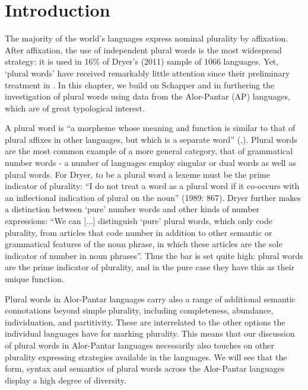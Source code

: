  
\section{Introduction}\label{sec:9:1}%
 
\hypertarget{Toc376962648}{}
The majority of the world's languages express nominal plurality by affixation. After affixation, the use of independent plural words is the most widespread strategy: it is used in 16\% of Dryer's (2011) sample of 1066 languages.\nocite{Dryer2011} Yet, `plural words' have received remarkably little attention since their preliminary treatment in \citet{Dryer1989}. In this chapter, we build on Schapper and \citet{Klamer2011} in furthering the investigation of plural words using data from the Alor-Pantar (AP) languages, which are of great typological interest.

A plural word is ``a morpheme whose meaning and function is similar to that of plural affixes in other languages, but which is a separate word'' (\citealt[865]{Dryer1989},\citealt[166]{Dryer2007}). Plural words are the most common example of a more general category, that of grammatical number words - a number of languages employ singular or dual words as well as plural words. For Dryer, to be a plural word a lexeme must be the prime indicator of plurality: ``I do not treat a word as a plural word if it co-occurs with an inflectional indication of plural on the noun'' (1989: 867). Dryer further makes a distinction between `pure' number words and other kinds of number expressions: ``We can [...] distinguish `pure' plural words, which only code plurality, from articles that code number in addition to other semantic or grammatical features of the noun phrase, in which these articles are the sole indicator of number in noun phrases''. Thus the bar is set quite high: plural words are the prime indicator of plurality, and in the
pure case they have this as their unique function.

 Plural words in Alor-Pantar languages carry also a range of additional semantic connotations beyond simple plurality, including completeness, abundance, individuation, and partitivity. These are interrelated to the other options the individual languages have for marking plurality. This means that our discussion of plural words in Alor-Pantar languages necessarily also touches on other plurality expressing strategies available in the languages. We will see that the form, syntax and semantics of plural words across the Alor-Pantar languages display a high degree of diversity.

